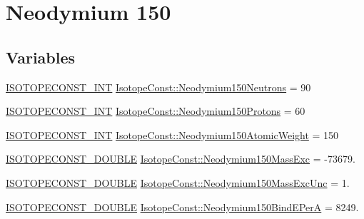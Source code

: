 \hypertarget{group___isotope_const-_neodymium-_nd150}{}\section{Neodymium 150}
\label{group___isotope_const-_neodymium-_nd150}
\subsection*{Variables}
\begin{DoxyCompactItemize}
\item 
\mbox{\hyperlink{group___isotope_const-_macros_ga5f18360b3e99483a35c32d789e62621c}{I\+S\+O\+T\+O\+P\+E\+C\+O\+N\+S\+T\+\_\+\+I\+NT}} \mbox{\hyperlink{group___isotope_const-_neodymium-_nd150_gac1e12a046cfb3c6c9e4e0706d30a825b}{Isotope\+Const\+::\+Neodymium150\+Neutrons}} = 90
\item 
\mbox{\hyperlink{group___isotope_const-_macros_ga5f18360b3e99483a35c32d789e62621c}{I\+S\+O\+T\+O\+P\+E\+C\+O\+N\+S\+T\+\_\+\+I\+NT}} \mbox{\hyperlink{group___isotope_const-_neodymium-_nd150_ga105c73bb78ff1b731397e578b27db388}{Isotope\+Const\+::\+Neodymium150\+Protons}} = 60
\item 
\mbox{\hyperlink{group___isotope_const-_macros_ga5f18360b3e99483a35c32d789e62621c}{I\+S\+O\+T\+O\+P\+E\+C\+O\+N\+S\+T\+\_\+\+I\+NT}} \mbox{\hyperlink{group___isotope_const-_neodymium-_nd150_ga90afddf35c4158f1c18e631bd577515c}{Isotope\+Const\+::\+Neodymium150\+Atomic\+Weight}} = 150
\item 
\mbox{\hyperlink{group___isotope_const-_macros_ga8f45a7272ce02c0b4c65c44636ed719a}{I\+S\+O\+T\+O\+P\+E\+C\+O\+N\+S\+T\+\_\+\+D\+O\+U\+B\+LE}} \mbox{\hyperlink{group___isotope_const-_neodymium-_nd150_gaf40a93e27ea867dad8c36f736b84d341}{Isotope\+Const\+::\+Neodymium150\+Mass\+Exc}} = -\/73679.
\item 
\mbox{\hyperlink{group___isotope_const-_macros_ga8f45a7272ce02c0b4c65c44636ed719a}{I\+S\+O\+T\+O\+P\+E\+C\+O\+N\+S\+T\+\_\+\+D\+O\+U\+B\+LE}} \mbox{\hyperlink{group___isotope_const-_neodymium-_nd150_ga2012b037f055b120c8927ba8372306e7}{Isotope\+Const\+::\+Neodymium150\+Mass\+Exc\+Unc}} = 1.
\item 
\mbox{\hyperlink{group___isotope_const-_macros_ga8f45a7272ce02c0b4c65c44636ed719a}{I\+S\+O\+T\+O\+P\+E\+C\+O\+N\+S\+T\+\_\+\+D\+O\+U\+B\+LE}} \mbox{\hyperlink{group___isotope_const-_neodymium-_nd150_gac8c68279099cea3790edfd41d62b10d5}{Isotope\+Const\+::\+Neodymium150\+Bind\+E\+PerA}} = 8249.
\item 

\end{DoxyCompactItemize}
